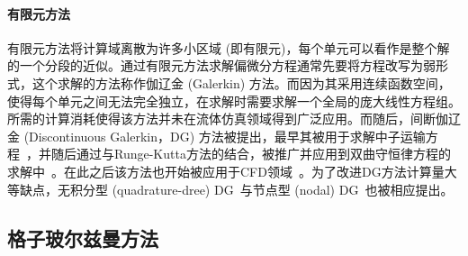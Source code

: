 \paragraph{有限元方法}
有限元方法将计算域离散为许多小区域 (即有限元)，每个单元可以看作是整个解的一个分段的近似。通过有限元方法求解偏微分方程通常先要将方程改写为弱形式，这个求解的方法称作伽辽金 (Galerkin) 方法。而因为其采用连续函数空间，使得每个单元之间无法完全独立，在求解时需要求解一个全局的庞大线性方程组。所需的计算消耗使得该方法并未在流体仿真领域得到广泛应用。而随后，间断伽辽金 (Discontinuous Galerkin，DG) 方法被提出，最早其被用于求解中子运输方程~\cite{reed1973triangular}，并随后通过与Runge-Kutta方法的结合，被推广并应用到双曲守恒律方程的求解中~\cite{cockburn1989tvb2, cockburn1989tvb3, cockburn1990runge, cockburn2001runge}。在此之后该方法也开始被应用于CFD领域~\cite{Zienkiewicz-2013, bassi1997high, lomtev1999discontinuous}。为了改进DG方法计算量大等缺点，无积分型 (quadrature-dree) DG~\cite{atkins1998quadrature}与节点型 (nodal) DG~\cite{hesthaven2007nodal}也被相应提出。

\subsection{格子玻尔兹曼方法}
